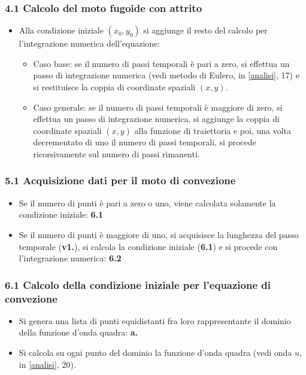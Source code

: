 \subsubsection*{4.1 Calcolo del moto fugoide con attrito}
\begin{itemize}
\item Alla condizione iniziale $(x_0,y_0)$ si aggiunge il resto del calcolo per l'integrazione numerica dell'equazione:
\begin{itemize}
\item Caso base: se il numero di passi temporali è pari a zero, si effettua un passo di integrazione numerica (vedi metodo di Eulero, in \ref{analisi}, 17) e si restituisce la coppia di coordinate spaziali $(x,y)$.
\item Caso generale: se il numero di passi temporali è maggiore di zero, si effettua un passo di integrazione numerica, si aggiunge la coppia di coordinate spaziali $(x,y)$ alla funzione di traiettoria e poi, una volta decrementato di uno il numero di passi temporali, si procede ricorsivamente sul numero di passi rimanenti. 
\end{itemize}
\end{itemize}

\subsubsection*{5.1 Acquisizione dati per il moto di convezione}
\begin{itemize}
\item Se il numero di punti è pari a zero o uno, viene calcolata solamente la condizione iniziale: \textbf{6.1}
\item Se il numero di punti è maggiore di uno, si acquisisce la lunghezza del passo temporale (\textbf{v1.}), si calcola la condizione iniziale (\textbf{6.1}) e si procede con l'integrazione numerica: \textbf{6.2} 
\end{itemize}

\subsubsection*{6.1 Calcolo della condizione iniziale per l'equazione di convezione}
\begin{itemize}
\item Si genera una lista di punti equidistanti fra loro rappresentante il dominio della funzione d'onda quadra: \textbf{a.} 
\item Si calcola su ogni punto del dominio la funzione d'onda quadra (vedi onda $u$, in \ref{analisi}, 20). 
\end{itemize}

